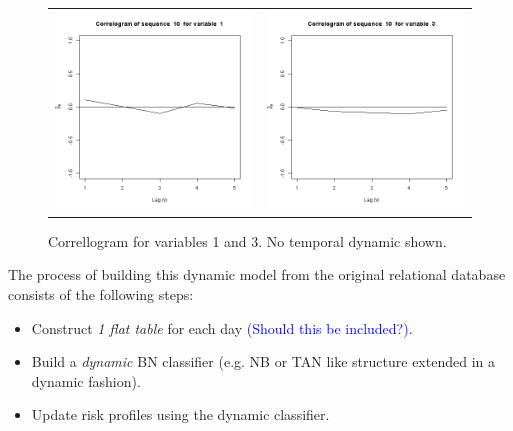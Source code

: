 \begin{figure}
  \centering
    \begin{tabular}{cc}
    \includegraphics[width=70mm]{figures/CajaMarcrl1}&
     \includegraphics[width=70mm]{figures/CajaMarcrl3}\\
  \end{tabular}
    \caption{\label{fig:cajamarPC1order}Correllogram for variables 1 and 3. No temporal dynamic shown.}
\end{figure}


The process of building this dynamic model from the original relational database consists of the following steps:

\begin{itemize}
\item Construct \emph{1 flat table} for each day \textcolor{blue}{(Should this be included?)}.
\item Build a \emph{dynamic} BN classifier (e.g. NB or TAN like structure extended in a dynamic fashion). 
\item Update risk profiles using the dynamic classifier.
\end{itemize}






